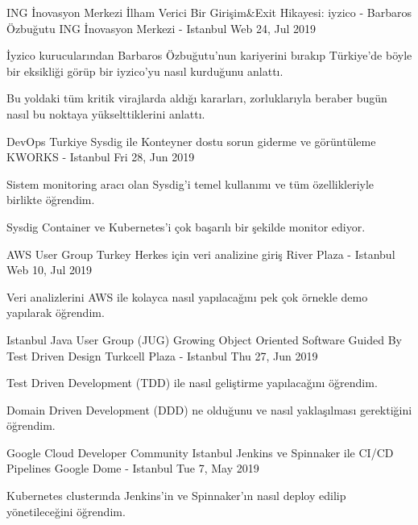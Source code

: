\begin{cventries}
{    }
    \cventry
    {ING İnovasyon Merkezi}
    {İlham Verici Bir Girişim\&Exit Hikayesi: iyzico - Barbaros Özbuğutu}
    {ING İnovasyon Merkezi - Istanbul}
    {Web 24, Jul 2019}
    {
      \begin{cvitems}
        \item{İyzico kurucularından Barbaros Özbuğutu'nun kariyerini bırakıp Türkiye'de böyle bir eksikliği görüp bir iyzico'yu nasıl kurduğunu anlattı.}
        \item{Bu yoldaki tüm kritik virajlarda aldığı kararları, zorluklarıyla beraber bugün nasıl bu noktaya yükselttiklerini anlattı.}
      \end{cvitems}
    }
    \cventry
    {DevOps Turkiye}
    {Sysdig ile Konteyner dostu sorun giderme ve görüntüleme}
    {KWORKS - Istanbul}
    {Fri 28, Jun 2019}
    {
      \begin{cvitems}
        \item{Sistem monitoring aracı olan Sysdig'i temel kullanımı ve tüm özellikleriyle birlikte öğrendim.}
        \item{Sysdig Container ve Kubernetes'i çok başarılı bir şekilde monitor ediyor.}
      \end{cvitems}
    }
    \cventry
    {AWS User Group Turkey}
    {Herkes için veri analizine giriş}
    {River Plaza - Istanbul}
    {Web 10, Jul 2019}
    {
      \begin{cvitems}
        \item{Veri analizlerini AWS ile kolayca nasıl yapılacağını pek çok örnekle demo yapılarak öğrendim.}
      \end{cvitems}
    }
    \cventry
    {Istanbul Java User Group (JUG)}
    {Growing Object Oriented Software Guided By Test Driven Design}
    {Turkcell Plaza - Istanbul}
    {Thu 27, Jun 2019}
    {
      \begin{cvitems}
        \item{Test Driven Development (TDD) ile nasıl geliştirme yapılacağını öğrendim.}
        \item{Domain Driven Development (DDD) ne olduğunu ve nasıl yaklaşılması gerektiğini öğrendim.}
      \end{cvitems}
    }
    \cventry
    {Google Cloud Developer Community Istanbul}
    {Jenkins ve Spinnaker ile CI/CD Pipelines}
    {Google Dome - Istanbul}
    {Tue 7, May 2019}
    {
      \begin{cvitems}
        \item{Kubernetes clusterında Jenkins'in ve Spinnaker'ın nasıl deploy edilip yönetileceğini öğrendim.}

\end{cvitems}}
\end{cventries}
